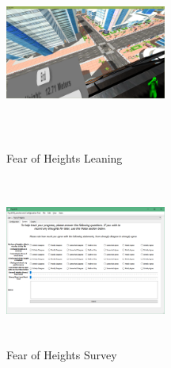 \documentclass[a4paper,10pt]{article}
\begin{document}
\begin{figure}[H]
	\centering
	\begin{minipage}{0.45\textwidth}
		\centering
		\includegraphics[width=200px, height=210px, keepaspectratio]{heightSS2.png}
		\caption{Fear of Heights Leaning}
		\label{fig:heightSS2}
	\end{minipage}\hfill
	\begin{minipage}{0.45\textwidth}
		\centering
		\includegraphics[width=200px, height=210px, keepaspectratio]{qtHeightSurvey.png}
		\caption{Fear of Heights Survey}
		\label{fig:heightSurvey}
	\end{minipage}
\end{figure}
\end{document}

